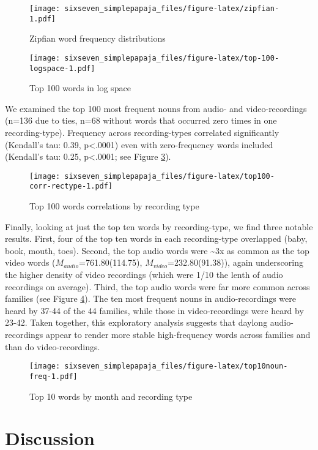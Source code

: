 \documentclass[floatsintext,man]{apa6}
\theoremstyle{definition}
\theoremstyle{definition}
\theoremstyle{definition}
\theoremstyle{remark}
\begin{document}
\begin{figure}
\centering
\texttt{[image: sixseven\_simplepapaja\_files/figure-latex/zipfian-1.pdf]}
\caption{\label{fig:zipfian}Zipfian word frequency distributions}
\end{figure}

\begin{figure}
\centering
\texttt{[image: sixseven\_simplepapaja\_files/figure-latex/top-100-logspace-1.pdf]}
\caption{\label{fig:top-100-logspace}Top 100 words in log space}
\end{figure}

We examined the top 100 most frequent nouns from audio- and
video-recordings (n=136 due to ties, n=68 without words that occurred
zero times in one recording-type). Frequency across recording-types
correlated significantly (Kendall's tau: 0.39, p\textless{}.0001) even
with zero-frequency words included (Kendall's tau: 0.25,
p\textless{}.0001; see Figure \ref{fig:top100-corr-rectype}).

\begin{figure}
\centering
\texttt{[image: sixseven\_simplepapaja\_files/figure-latex/top100-corr-rectype-1.pdf]}
\caption{\label{fig:top100-corr-rectype}Top 100 words correlations by
recording type}
\end{figure}

Finally, looking at just the top ten words by recording-type, we find
three notable results. First, four of the top ten words in each
recording-type overlapped (baby, book, mouth, toes). Second, the top
audio words were \textasciitilde{}3x as common as the top video words
(\(M_{audio}\)=761.80(114.75), \(M_{video}\)=232.80(91.38)), again
underscoring the higher density of video recordings (which were 1/10 the
lenth of audio recordings on average). Third, the top audio words were
far more common across families (see Figure \ref{fig:top10noun-freq}).
The ten most frequent nouns in audio-recordings were heard by 37-44 of
the 44 families, while those in video-recordings were heard by 23-42.
Taken together, this exploratory analysis suggests that daylong
audio-recordings appear to render more stable high-frequency words
across families and than do video-recordings.

\begin{figure}
\centering
\texttt{[image: sixseven\_simplepapaja\_files/figure-latex/top10noun-freq-1.pdf]}
\caption{\label{fig:top10noun-freq}Top 10 words by month and recording type}
\end{figure}

\section{Discussion}\label{discussion}
\end{document}
